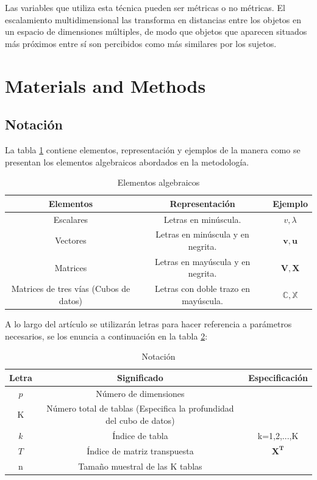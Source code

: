 \documentclass[water,article,submit,moreauthors,pdftex]{mdpi}
\begin{document}
Las variables que utiliza esta técnica pueden ser métricas o no
métricas. El escalamiento multidimensional las transforma en distancias
entre los objetos en un espacio de dimensiones múltiples, de modo que
objetos que aparecen situados más próximos entre sí son percibidos como
más similares por los sujetos.

\hypertarget{materials-and-methods}{%
\section{Materials and Methods}\label{materials-and-methods}}

\hypertarget{notaciuxf3n}{%
\subsection{Notación}\label{notaciuxf3n}}

La tabla \ref{tab:notacion} contiene elementos, representación y
ejemplos de la manera como se presentan los elementos algebraicos
abordados en la metodología.

\begin{table}[!ht]
\begin{center}
 \begin{tabular}{||c ||c |c ||} 
 \hline
 Elementos & Representación & Ejemplo \\
 \hline\hline
 Escalares & Letras en minúscula. & $v,\lambda$\\
\hline
Vectores & Letras en minúscula y en negrita. & $\mathbf{v},\mathbf{u}$\\
\hline
Matrices & Letras en mayúscula y en negrita. & $\mathbf{V},\mathbf{X}$\\
\hline
Matrices de tres vías (Cubos de datos) & Letras con doble trazo en mayúscula. & $\mathbb{C},\mathbb{X}$\\
\hline
\end{tabular}\caption{Elementos algebraicos}
\label{tab:notacion}
\end{center}
\end{table}

A lo largo del artículo se utilizarán letras para hacer referencia a
parámetros necesarios, se los enuncia a continuación en la tabla
\ref{tab:notacion2}:

\begin{table}[!ht]
\begin{center}
 \begin{tabular}{||c ||c | c ||} 
 \hline
 Letra &  Significado & Especificación\\
 \hline\hline
 $p$ & Número de dimensiones &\\
\hline
 K & Número total de tablas (Especifica la profundidad del cubo de datos) & \\
 \hline
 $k$ & Índice de tabla &  k=1,2,...,K\\
  \hline
 $T$ & Índice de matriz transpuesta &  $\mathbf{X^{T}}$\\
\hline
 n & Tamaño muestral de las K tablas &\\
\hline
\end{tabular}\caption{Notación}
\label{tab:notacion2}
\end{center}
\end{table}
\end{document}
